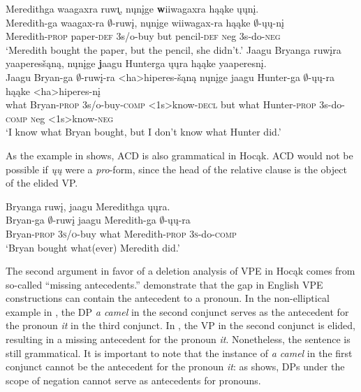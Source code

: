 \documentclass[output=paper]{LSP/langsci}
\begin{document}
\ea
\ea\label{ex:johnson:47a}
\glll Meredithga waagaxra ruw\k{\i}, nųnįge {\textbf wiiwagaxra} hąąke ųųnį.\\
Meredith-ga waagax-ra $\emptyset$-ruwį, nųnįge wiiwagax-ra hąąke $\emptyset$-ųų-nį\\
Meredith-\textsc{prop} paper-\textsc{def} {\textsc 3s/o}-buy but pencil-\textsc{def} {\textsc neg} {\textsc 3s}-do-\textsc{neg}\\
\trans `Meredith bought the paper, but the pencil, she didn't.'
\ex\label{ex:johnson:47b}
\glll Jaagu Bryanga ruwįra yaaperesšąną, nųnįge {\textbf jaagu} Hunterga ųųra hąąke yaaperesnį.\\
Jaagu Bryan-ga $\emptyset$-ruwį-ra <ha>hiperes-šąną nųnįge jaagu Hunter-ga $\emptyset$-ųų-ra hąąke <ha>hiperes-nį\\
what Bryan-\textsc{prop} {\textsc 3s/o}-buy-\textsc{comp} <{\textsc 1s}>know-\textsc{decl} but what Hunter-\textsc{prop} {\textsc 3s}-do-\textsc{comp} {\textsc neg} <{\textsc 1s}>know-\textsc{neg}\\
\trans `I know what Bryan bought, but I don't know what Hunter did.'
\z
\z

As the example in  shows, ACD is also grammatical in Hocąk. ACD would not be possible if \emph{ųų} were a \emph{pro}-form, since the head of the relative clause is the object of the elided VP.

\ea\label{ex:johnson:48}
\glll Bryanga ruwį, jaagu Meredithga ųųra.\\
Bryan-ga $\emptyset$-ruwį jaagu Meredith-ga $\emptyset$-ųų-ra\\
Bryan-\textsc{prop} \textsc{3s/o}-buy what Meredith-\textsc{prop} \textsc{3s}-do-\textsc{comp}\\
\trans `Bryan bought what(ever) Meredith did.'
\z

The second argument in favor of a deletion analysis of VPE in Hocąk comes from so-called ``missing antecedents.'' \citet{HankamerSag1976} demonstrate that the gap in English VPE constructions can contain the antecedent to a pronoun. In the non-elliptical example in , the DP \emph{a camel} in the second conjunct serves as the antecedent for the pronoun \emph{it} in the third conjunct. In , the VP in the second conjunct is elided, resulting in a missing antecedent for the pronoun \emph{it}. Nonetheless, the sentence is still grammatical. It is important to note that the instance of \emph{a camel} in the first conjunct cannot be the antecedent for the pronoun \emph{it}: as  shows, DPs under the scope of negation cannot serve as antecedents for pronouns.
\end{document}
